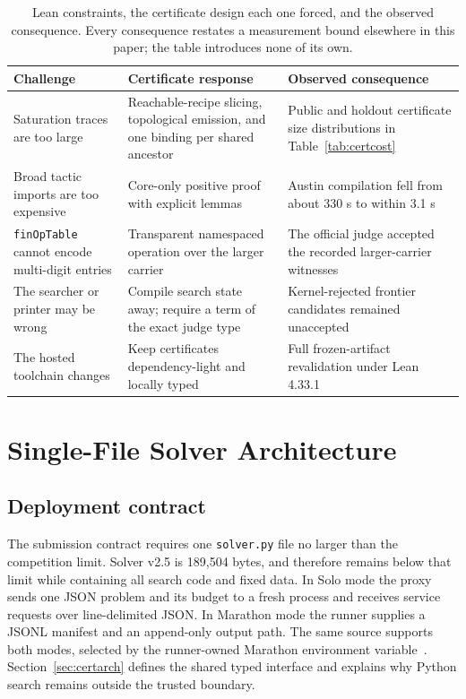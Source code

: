 \documentclass[10pt,twocolumn]{article}
\newcommand{\code}[1]{\texttt{#1}}
\begin{document}
\begin{table}[t]
\caption{Lean constraints, the certificate design each one forced, and the
observed consequence.  Every consequence restates a measurement bound
elsewhere in this paper; the table introduces none of its own.}
\label{tab:lean-design}
\scriptsize
\setlength{\tabcolsep}{4pt}
\begin{tabularx}{\textwidth}{@{}p{}p{}Y@{}}
\toprule
Challenge & Certificate response & Observed consequence \\
\midrule
Saturation traces are too large & Reachable-recipe slicing, topological
emission, and one binding per shared ancestor & Public and holdout certificate
size distributions in Table~\ref{tab:certcost} \\
Broad tactic imports are too expensive & Core-only positive proof with
explicit lemmas & Austin compilation fell from about 330 s to within 3.1 s \\
\code{finOpTable} cannot encode multi-digit entries & Transparent namespaced
operation over the larger carrier & The official judge accepted the recorded
larger-carrier witnesses \\
The searcher or printer may be wrong & Compile search state away; require a
term of the exact judge type & Kernel-rejected frontier candidates remained
unaccepted \\
The hosted toolchain changes & Keep certificates dependency-light and locally
typed & Full frozen-artifact revalidation under Lean 4.33.1 \\
\bottomrule
\end{tabularx}
\end{table}

\section{Single-File Solver Architecture}
\label{sec:arch}

\subsection{Deployment contract}

The submission contract requires one \code{solver.py} file no larger than the
competition limit.  Solver v2.5 is 189,504 bytes, and therefore remains below
that limit while containing all search code and fixed data.  In Solo mode the
proxy sends one JSON problem and its budget to a fresh process and receives
service requests over line-delimited JSON.  In Marathon mode the runner supplies
a JSONL manifest and an append-only output path.  The same source supports both
modes, selected by the runner-owned Marathon environment
variable~\cite{competitionRules}.  Section~\ref{sec:certarch} defines the
shared typed interface and explains why Python search remains outside the
trusted boundary.
\end{document}
